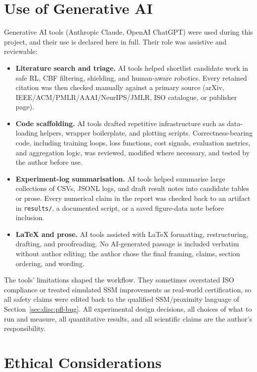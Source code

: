 \documentclass[11pt,a4paper]{report}
\newcommand{\ssm}{SSM}
\begin{document}
\chapter{Use of Generative AI}
\label{app:genai}

Generative AI tools (Anthropic Claude, OpenAI ChatGPT) were used during
this project, and their use is declared here in full. Their role was
assistive and reviewable:
\begin{itemize}[topsep=2pt,itemsep=1pt]
\item \textbf{Literature search and triage.} AI tools helped shortlist
  candidate work in safe RL, CBF filtering, shielding, and human-aware
  robotics. Every retained citation was then checked manually against a
  primary source (arXiv, IEEE/ACM/PMLR/AAAI/NeurIPS/JMLR, ISO
  catalogue, or publisher page). 
\item \textbf{Code scaffolding.} AI tools drafted repetitive
  infrastructure such as data-loading helpers, wrapper boilerplate, and
  plotting scripts. Correctness-bearing code, including training loops,
  loss functions, cost signals, evaluation metrics, and aggregation
  logic, was reviewed, modified where necessary, and tested by the
  author before use.
\item \textbf{Experiment-log summarisation.} AI tools helped summarise
  large collections of CSVs, JSONL logs, and draft result notes into
  candidate tables or prose. Every numerical claim in the report was
  checked back to an artifact in \texttt{results/}, a documented script,
  or a saved figure-data note before inclusion.
\item \textbf{\LaTeX{} and prose.} AI tools assisted with \LaTeX{}
  formatting, restructuring, drafting, and proofreading. No AI-generated
  passage is included verbatim without author editing; the author chose
  the final framing, claims, section ordering, and wording.
\end{itemize}

The tools' limitations shaped the workflow. They sometimes overstated
ISO compliance or treated simulated \ssm{} improvements as real-world
certification, so all safety claims were edited back to the qualified
\ssm{}/proximity language of Section~\ref{sec:disc:pfl-bug}. All experimental design decisions, all
choices of what to run and measure, all quantitative results, and all
scientific claims are the author's responsibility.

\chapter{Ethical Considerations}
\label{app:ethics}
\end{document}
